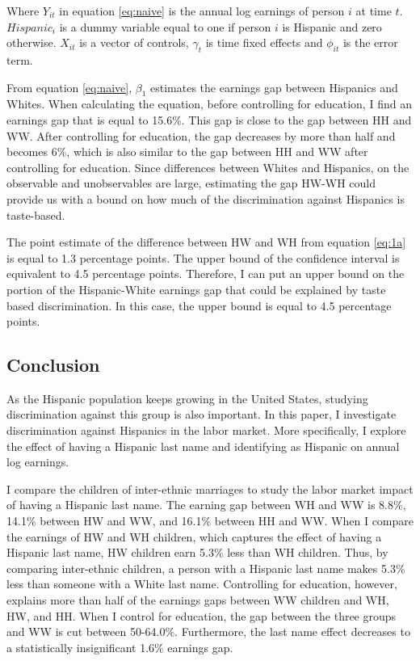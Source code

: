 \documentclass[12pt, fullpage]{article}
\begin{document}
 Where $Y_{it}$ in equation \ref{eq:naive} is the annual log earnings of person $i$ at time $t$. $Hispanic_{i}$ is a dummy variable equal to one if person $i$ is Hispanic and zero otherwise. $X_{it}$ is a vector of controls, $\gamma_{t}$ is time fixed effects and $\phi_{it}$ is the error term.
 


 From equation \ref{eq:naive}, $\beta_{1}$ estimates the earnings gap between Hispanics and Whites. When calculating the equation, before controlling for education, I find an earnings gap that is equal to 15.6\%. This gap is close to the gap between HH and WW. After controlling for education, the gap decreases by more than half and becomes 6\%, which is also similar to the gap between HH and WW after controlling for education. Since differences between Whites and Hispanics, on the observable and unobservables are large, estimating the gap HW-WH could provide us with a bound on how much of the discrimination against Hispanics is taste-based. 
 
The point estimate of the difference between HW and WH from equation \ref{eq:1a} is equal to 1.3 percentage points. The upper bound of the confidence interval is equivalent to 4.5 percentage points. Therefore, I can put an upper bound on the portion of the Hispanic-White earnings gap that could be explained by taste based discrimination. In this case, the upper bound is equal to 4.5 percentage points.



\subsection{Conclusion}\label{sec:con}

As the Hispanic population keeps growing in the United States, studying discrimination against this group is also important. In this paper, I investigate discrimination against Hispanics in the labor market. More specifically, I explore the effect of having a Hispanic last name and identifying as Hispanic on annual log earnings. 

I compare the children of inter-ethnic marriages to study the labor market impact of having a Hispanic last name. The earning gap between WH and WW is 8.8\%, 14.1\% between HW and WW, and 16.1\% between HH and WW. When I compare the earnings of HW and WH children, which captures the effect of having a Hispanic last name, HW children earn 5.3\% less than WH children. Thus, by comparing inter-ethnic children, a person with a Hispanic last name makes 5.3\% less than someone with a White last name. Controlling for education, however, explains more than half of the earnings gaps between WW children and WH, HW, and HH. When I control for education, the gap between the three groups and WW is cut between 50-64.0\%. Furthermore, the last name effect decreases to a statistically insignificant 1.6\% earnings gap.
\end{document}
